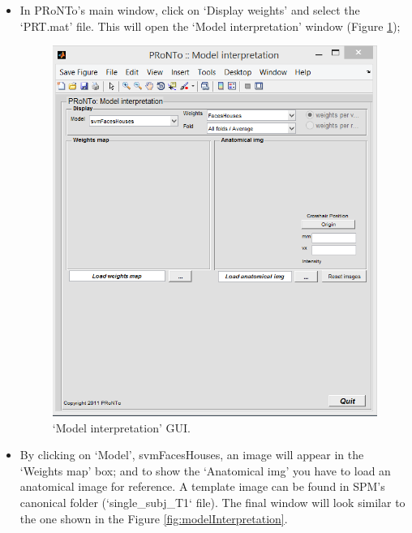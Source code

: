 \begin{itemize}
	
	\item In PRoNTo's main window, click on `Display weights' and select the `PRT.mat' file. This will open the `Model interpretation' window (Figure \ref{fig:modelInterpretationMain});
	
	\begin{figure}[h!]
	\centering
		\includegraphics[scale=0.6]{images/Tutorial/classification/modelInterpretationMain.png}
	\caption{`Model interpretation' GUI.}
	\label{fig:modelInterpretationMain}
\end{figure}

	
	\item By clicking on `Model', svmFacesHouses, an image will appear in the `Weights map' box; and to show the `Anatomical img' you have to load an anatomical image for reference. A template image can be found in SPM's canonical folder (`single\_subj\_T1` file). The final window will look similar to the one shown in the Figure \ref{fig:modelInterpretation}.


\end{itemize}
